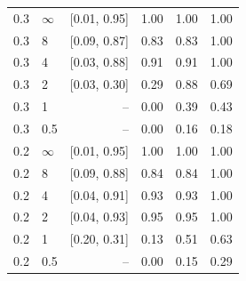 \begin{tabular}{@{}llrrrr@{}}
0.3 & $\infty$ & [0.01, 0.95] & 1.00 & 1.00 & 1.00 \\
0.3 & 8 & [0.09, 0.87] & 0.83 & 0.83 & 1.00 \\
0.3 & 4 & [0.03, 0.88] & 0.91 & 0.91 & 1.00 \\
0.3 & 2 & [0.03, 0.30] & 0.29 & 0.88 & 0.69 \\
0.3 & 1 & -- & 0.00 & 0.39 & 0.43 \\
0.3 & 0.5 & -- & 0.00 & 0.16 & 0.18 \\
0.2 & $\infty$ & [0.01, 0.95] & 1.00 & 1.00 & 1.00 \\
0.2 & 8 & [0.09, 0.88] & 0.84 & 0.84 & 1.00 \\
0.2 & 4 & [0.04, 0.91] & 0.93 & 0.93 & 1.00 \\
0.2 & 2 & [0.04, 0.93] & 0.95 & 0.95 & 1.00 \\
0.2 & 1 & [0.20, 0.31] & 0.13 & 0.51 & 0.63 \\
0.2 & 0.5 & -- & 0.00 & 0.15 & 0.29 \\
\bottomrule
\end{tabular}